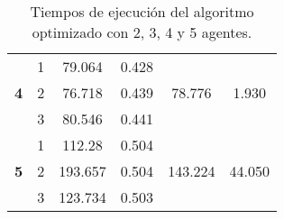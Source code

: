 \begin{table}[H]
{\begin{tabular}{|c|c|llcc|}
		\multirow{3}{*}{\textbf{4}}       & 1                                 & \multicolumn{1}{c|}{79.064}                    & \multicolumn{1}{c|}{0.428}                                  & \multicolumn{1}{c|}{\multirow{3}{*}{78.776}}            & \multirow{3}{*}{1.930}           \\ \cline{2-4}
		& 2                                 & \multicolumn{1}{c|}{76.718}                    & \multicolumn{1}{c|}{0.439}                                  & \multicolumn{1}{c|}{}                                   &                                  \\ \cline{2-4}
		& 3                                 & \multicolumn{1}{c|}{80.546}                    & \multicolumn{1}{c|}{0.441}                                  & \multicolumn{1}{c|}{}                                   &                                  \\ \hline
		\multirow{3}{*}{\textbf{5}}       & 1                                 & \multicolumn{1}{c|}{112.28}                    & \multicolumn{1}{c|}{0.504}                                  & \multicolumn{1}{c|}{\multirow{3}{*}{143.224}}           & \multirow{3}{*}{44.050}          \\ \cline{2-4}
		& 2                                 & \multicolumn{1}{c|}{193.657}                   & \multicolumn{1}{c|}{0.504}                                  & \multicolumn{1}{c|}{}                                   &                                  \\ \cline{2-4}
		& 3                                 & \multicolumn{1}{c|}{123.734}                   & \multicolumn{1}{c|}{0.503}                                  & \multicolumn{1}{c|}{}                                   &                                  \\ \hline
	\end{tabular}}
	\caption{Tiempos de ejecución del algoritmo optimizado con 2, 3, 4 y 5 agentes.}
	\label{cuadro:tiempos_optim}
\end{table}

